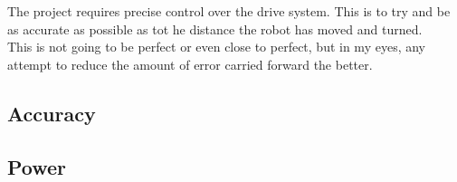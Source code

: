 \documentclass{article}
\begin{document}
The project requires precise control over the drive system.  This is to try and be as accurate as possible as tot he distance the robot has moved and turned.
\\This is not going to be perfect or even close to perfect, but in my eyes, any attempt to reduce the amount of error carried forward the better.
\subsection{Accuracy}

\subsection{Power}



\end{document}
